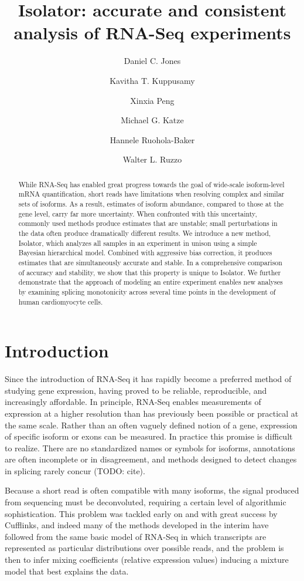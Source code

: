 \documentclass[twocolumn]{article}
\title{Isolator: accurate and consistent analysis of RNA-Seq experiments}
\author{Daniel C. Jones \and Kavitha T. Kuppusamy \and Xinxia Peng \and Michael G. Katze \and Hannele Ruohola-Baker \and Walter L. Ruzzo}
\date{}
\begin{document}
\maketitle

\begin{abstract}
    While RNA-Seq has enabled great progress towards the goal of wide-scale
    isoform-level mRNA quantification, short reads have limitations when
    resolving complex and similar sets of isoforms. As a result, estimates
    of isoform abundance, compared to those at the gene level, carry far
    more uncertainty. When confronted with this uncertainty, commonly used
    methods produce estimates that are unstable; small perturbations in the
    data often produce dramatically different results. We introduce a new
    method, Isolator, which analyzes all samples in an experiment in unison
    using a simple Bayesian hierarchical model. Combined with aggressive bias
    correction, it produces estimates that are simultaneously accurate and
    stable. In a comprehensive comparison of accuracy and stability, we show
    that this property is unique to Isolator. We further demonstrate that
    the approach of modeling an entire experiment enables new analyses by
    examining splicing monotonicity across several time points in the
    development of human cardiomyocyte cells.
\end{abstract}


\section{Introduction}\label{introduction}

Since the introduction of RNA-Seq it has rapidly become a preferred
method of studying gene expression, having proved to be reliable,
reproducible, and increasingly affordable. In principle, RNA-Seq enables
measurements of expression at a higher resolution than has previously
been possible or practical at the same scale. Rather than an often
vaguely defined notion of a gene, expression of specific isoform or
exons can be measured. In practice this promise is difficult to realize.
There are no standardized names or symbols for isoforms, annotations are
often incomplete or in disagreement, and methods designed to detect
changes in splicing rarely concur (TODO: cite).

Because a short read is often compatible with many isoforms, the signal
produced from sequencing must be deconvoluted, requiring a certain level
of algorithmic sophistication. This problem was tackled early on and
with great success by Cufflinks, and indeed many of the methods
developed in the interim have followed from the same basic model of
RNA-Seq in which transcripts are represented as particular distributions
over possible reads, and the problem is then to infer mixing
coefficients (relative expression values) inducing a mixture model that
best explains the data.
\end{document}
